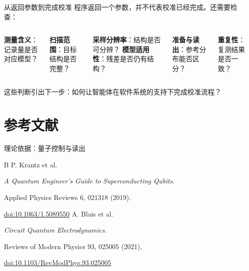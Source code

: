 \documentclass[aspectratio=169,12pt,fontset=none]{ctexbeamer}
\begin{document}
\begin{frame}{从返回参数到完成校准}
 程序返回一个参数，并不代表校准已经完成。还需要检查：
 \vspace{2mm}
 \begin{columns}[T,onlytextwidth]
 \textbf{测量含义}：记录量是否对应模型？\par\vspace{2mm}
 \textbf{扫描范围}：目标结构是否完整？\par\vspace{2mm}
 \textbf{采样分辨率}：结构是否可分辨？
 \textbf{模型适用性}：残差是否仍有结构？\par\vspace{2mm}
 \textbf{准备与读出}：参考分布能否区分？\par\vspace{2mm}
 \textbf{重复性}：复测结果是否一致？
 \end{columns}
 \vspace{4mm}\par
 这些判断引出下一步：如何让智能体在软件系统的支持下完成校准流程？
\end{frame}


\section[参考文献]{参考文献}
\begin{frame}{理论依据：量子控制与读出}
 \begin{thebibliography}{B}
  P. Krantz et al.\par
 \emph{A Quantum Engineer's Guide to Superconducting Qubits}.\par
 Applied Physics Reviews 6, 021318 (2019).\par
 {\small\href{https://doi.org/10.1063/1.5089550}{doi:10.1063/1.5089550}}
  A. Blais et al.\par
 \emph{Circuit Quantum Electrodynamics}.\par
 Reviews of Modern Physics 93, 025005 (2021).\par
 {\small\href{https://doi.org/10.1103/RevModPhys.93.025005}{doi:10.1103/RevModPhys.93.025005}}
 \end{thebibliography}
\end{frame}

\appendix
\end{document}
